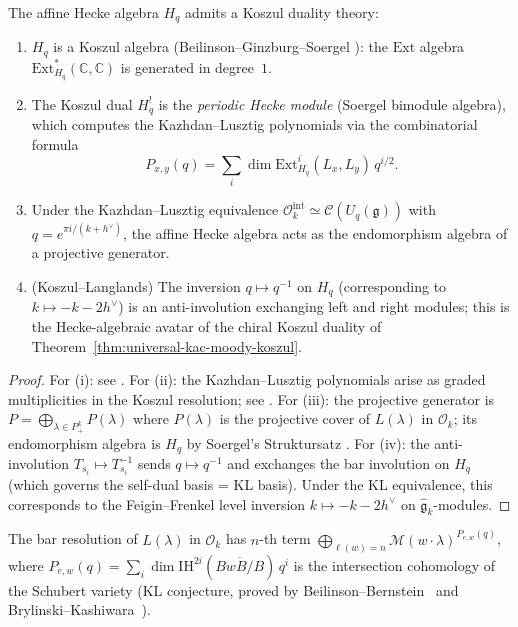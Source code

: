 \begin{proposition}
\label{prop:affine-hecke-kd}
The affine Hecke algebra $H_q$ admits a Koszul duality theory:
\begin{enumerate}[label=\textup{(\roman*)}]
\item $H_q$ is a Koszul algebra \textup{(}Beilinson--Ginzburg--Soergel
  \cite{BGS96}\textup{)}: the $\mathrm{Ext}$ algebra
  $\mathrm{Ext}^*_{H_q}(\mathbb{C}, \mathbb{C})$ is
  generated in degree~$1$.
\item The Koszul dual $H_q^!$ is the \emph{periodic Hecke module}
  (Soergel bimodule algebra), which computes the
  Kazhdan--Lusztig polynomials via the combinatorial
  formula
  \[
  P_{x,y}(q) = \sum_i \dim \mathrm{Ext}^i_{H_q}(L_x, L_y)\,
  q^{i/2}.
  \]
\item Under the Kazhdan--Lusztig equivalence
  $\mathcal{O}_k^{\mathrm{int}} \simeq \mathcal{C}(U_q(\mathfrak{g}))$
  with $q = e^{\pi i/(k + h^\vee)}$, the affine Hecke algebra acts as
  the endomorphism algebra of a projective generator.
\item \textup{(}Koszul--Langlands\textup{)} The inversion
  $q \mapsto q^{-1}$ on $H_q$ \textup{(}corresponding to
  $k \mapsto -k - 2h^\vee$\textup{)} is an anti-involution exchanging
  left and right modules; this is the Hecke-algebraic avatar of the
  chiral Koszul duality of Theorem~\textup{\ref{thm:universal-kac-moody-koszul}}.
\end{enumerate}
\end{proposition}

\begin{proof}
For (i): see \cite[Theorem~3.11.1]{BGS96}.
For (ii): the Kazhdan--Lusztig polynomials arise as graded
multiplicities in the Koszul resolution; see
\cite[Theorem~1.1]{Soergel97}.
For (iii): the projective generator is
$P = \bigoplus_{\lambda \in P_+^k} P(\lambda)$ where $P(\lambda)$
is the projective cover of $L(\lambda)$ in $\mathcal{O}_k$; its
endomorphism algebra is $H_q$ by Soergel's Struktursatz
\cite{Soergel97}.
For (iv): the anti-involution $T_{s_i} \mapsto T_{s_i}^{-1}$
sends $q \mapsto q^{-1}$ and exchanges the bar involution on $H_q$
(which governs the self-dual basis = KL basis).  Under the
KL equivalence, this corresponds to the Feigin--Frenkel level
inversion $k \mapsto -k - 2h^\vee$ on
$\widehat{\mathfrak{g}}_k$-modules.
\end{proof}

\begin{remark}
\label{rem:bar-complex-kl-polynomials}
The bar resolution of $L(\lambda)$ in $\mathcal{O}_k$ has $n$-th term $\bigoplus_{\ell(w) = n} \mathcal{M}(w \cdot \lambda)^{P_{e,w}(q)}$, where $P_{e,w}(q) = \sum_i \dim \mathrm{IH}^{2i}(\overline{BwB/B})\, q^i$ is the intersection cohomology of the Schubert variety (KL conjecture, proved by Beilinson--Bernstein~\cite{BB81} and Brylinski--Kashiwara~\cite{BK81}).
\end{remark}

